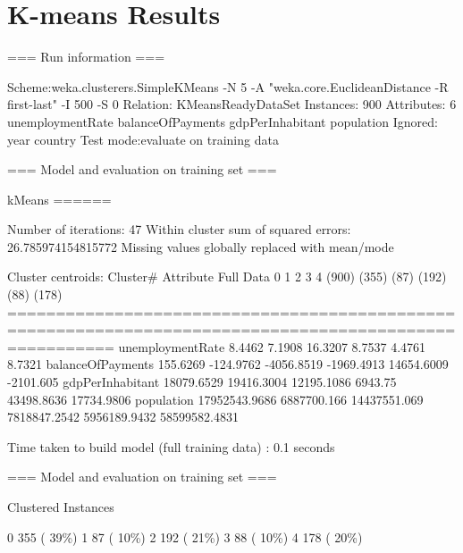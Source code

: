 \section{K-means Results}

=== Run information ===

Scheme:weka.clusterers.SimpleKMeans -N 5 -A "weka.core.EuclideanDistance -R first-last" -I 500 -S 0
Relation:     KMeansReadyDataSet
Instances:    900
Attributes:   6
              unemploymentRate
              balanceOfPayments
              gdpPerInhabitant
              population
Ignored:
              year
              country
Test mode:evaluate on training data

=== Model and evaluation on training set ===


kMeans
======

Number of iterations: 47
Within cluster sum of squared errors: 26.785974154815772
Missing values globally replaced with mean/mode

Cluster centroids:
                                       Cluster#
Attribute               Full Data             0             1             2             3             4
                            (900)         (355)          (87)         (192)          (88)         (178)
=======================================================================================================
unemploymentRate           8.4462        7.1908       16.3207        8.7537        4.4761        8.7321
balanceOfPayments        155.6269     -124.9762    -4056.8519    -1969.4913    14654.6009     -2101.605
gdpPerInhabitant       18079.6529    19416.3004    12195.1086       6943.75    43498.8636    17734.9806
population          17952543.9686   6887700.166  14437551.069  7818847.2542  5956189.9432 58599582.4831




Time taken to build model (full training data) : 0.1 seconds

=== Model and evaluation on training set ===

Clustered Instances

0      355 ( 39\%)
1       87 ( 10\%)
2      192 ( 21\%)
3       88 ( 10\%)
4      178 ( 20\%)

